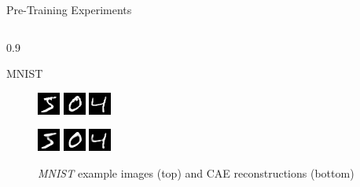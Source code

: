 \documentclass[final]{beamer}
\newlength{\onecolwid}
\newlength{\threecolwid}
\begin{document}
\begin{frame}[t]
\begin{columns}[t]
\begin{column}{\threecolwid}
\begin{alertblock}{Pre-Training Experiments}
\begin{columns}[t, totalwidth=0.9\threecolwid]
\begin{column}{0.9\onecolwid}
\begin{block}{MNIST}
\begin{figure}
\centering
\includegraphics[width=0.2\linewidth]{graphics/reconstructions/mnist/input_00.png}
\includegraphics[width=0.2\linewidth]{graphics/reconstructions/mnist/input_01.png}
\includegraphics[width=0.2\linewidth]{graphics/reconstructions/mnist/input_02.png}

\includegraphics[width=0.2\linewidth]{graphics/reconstructions/mnist/reconstruction_00.png}
\includegraphics[width=0.2\linewidth]{graphics/reconstructions/mnist/reconstruction_01.png}
\includegraphics[width=0.2\linewidth]{graphics/reconstructions/mnist/reconstruction_02.png}


\caption{\emph{MNIST} example images (top) and CAE reconstructions (bottom)}

\end{figure}


\end{block}
\end{column}
\end{columns}
\end{alertblock}
\end{column}
\end{columns}
\end{frame}
\end{document}
